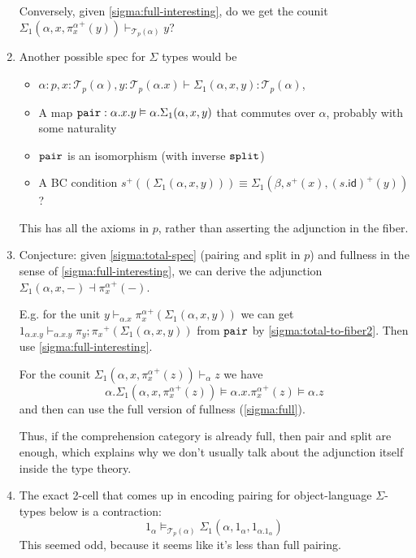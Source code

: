 \documentclass[10pt]{article}
\theoremstyle{definition}
\newcommand{\id}{\mathsf{id}}
\newcommand\TrPlus[2]{\ensuremath{{#1}^+(#2)}}
\newcommand\El[2]{\mathcal{T}_{#1}(#2)}
\begin{document}
\begin{enumerate}
  Conversely, given \ref{sigma:full-interesting}, do we get the counit
  $\Sigma_1(\alpha,x,\TrPlus{\pi^\alpha_x}{y}) \vdash_{\El{p}{\alpha}} y$?

\item \label{sigma:total-spec} Another possible spec for $\Sigma$ types
  would be
  \begin{itemize}
  \item $\alpha : p, x : \El{p}{\alpha}, y : \El{p}{\alpha.x} \vdash \Sigma_1(\alpha,x,y) : \El{p}{\alpha}$,
  \item A map $\mathtt{pair} : \alpha.x.y \vDash
    \alpha.\Sigma_1(\alpha,x,y)$ that commutes over $\alpha$, probably
    with some naturality
  \item $\mathtt{pair}$ is an isomorphism (with inverse $\mathtt{split}$)
  \item A BC condition $\TrPlus{s}{(\Sigma_1(\alpha,x,y))} \equiv
    \Sigma_1(\beta,\TrPlus{s}{x}, \TrPlus{(s . \id)}{y})$?
  \end{itemize}

  This has all the axioms in $p$, rather than asserting the adjunction
  in the fiber.

\item Conjecture: given \ref{sigma:total-spec} (pairing and split in
  $p$) and fullness in the sense of \ref{sigma:full-interesting}, we
  can derive the adjunction $\Sigma_1(\alpha,x,-) \dashv
  \TrPlus{\pi^\alpha_x}{-}$.

  E.g. for the unit $y \vdash_{\alpha.x} \TrPlus{\pi^\alpha_x}{\Sigma_1(\alpha,x,y)}$
  we can get
  $1_{\alpha.x.y} \vdash_{\alpha.x.y} \TrPlus{\pi_y;\pi_x}{\Sigma_1(\alpha,x,y)}$
  from $\mathtt{pair}$ by \ref{sigma:total-to-fiber2}.
  Then use \ref{sigma:full-interesting}.  

  For the counit
  $\Sigma_1(\alpha,x,\TrPlus{\pi^\alpha_x}{z}) \vdash_{\alpha} z$
  we have
  \[
  \alpha.\Sigma_1(\alpha,x,\TrPlus{\pi^\alpha_x}{z}) \vDash \alpha.x.\TrPlus{\pi^\alpha_x}{z} \vDash \alpha.z 
  \]
  and then can use the full version of fullness (\ref{sigma:full}).    

  Thus, if the comprehension category is already full, then pair and
  split are enough, which explains why we don't usually talk about the
  adjunction itself inside the type theory.  
  
\item The exact 2-cell that comes up in encoding pairing for
  object-language $\Sigma$-types below is a contraction:
  \[
  1_\alpha \vDash_{\El{p}{\alpha}} \Sigma_1(\alpha,1_\alpha,1_{\alpha.{1_\alpha}})
  \]
  This seemed odd, because it seems like it's less than full pairing.    


\end{enumerate}
\end{document}
